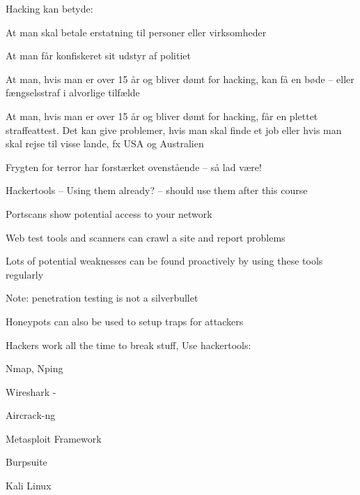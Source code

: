 \documentclass[Screen16to9,17pt]{foils}
\begin{document}
Hacking kan betyde:
\begin{list2}
\item At man skal betale erstatning til personer eller virksomheder
\item At man får konfiskeret sit udstyr af politiet
\item At man, hvis man er over 15 år og bliver dømt for hacking, kan
  få en bøde -- eller fængselsstraf i alvorlige tilfælde
\item At man, hvis man er over 15 år og bliver dømt for hacking, får
en plettet straffeattest. Det kan give problemer, hvis man skal finde
et job eller hvis man skal rejse til visse lande, fx USA og
Australien
\item Frygten for terror har forstærket ovenstående -- så lad være!
\end{list2}



\begin{list1}
\item Hackertools -- Using them already? -- should use them after this course
\item Portscans show potential access to your network
\item Web test tools and scanners can crawl a site and report problems
\item Lots of potential weaknesses can be found proactively by using these tools regularly
\item Note: penetration testing is not a silverbullet
\item Honeypots can also be used to setup traps for attackers
\end{list1}




\begin{list2}
\item Hackers work all the time to break stuff, Use hackertools:
\item Nmap, Nping 
\item Wireshark - 
\item Aircrack-ng 
\item Metasploit Framework 
\item Burpsuite 
\item Kali Linux 
\end{list2}
\end{document}
